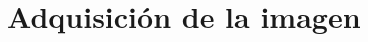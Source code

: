 \documentclass[a4paper, 11pt]{article}
\begin{document}


















\section{Adquisición de la imagen}
\end{document}
